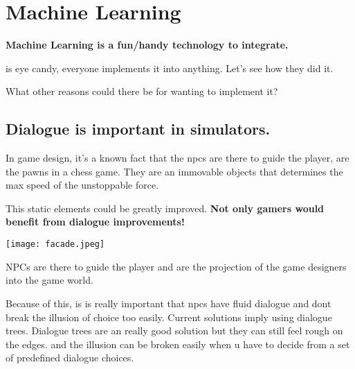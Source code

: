 



\chapter*{Machine Learning}
    \textbf{Machine Learning is a fun/handy technology to integrate.}

    is eye candy, everyone implements it into anything. Let's see how they did it.

    What other reasons could there be for wanting to implement it?

    \section*{Dialogue is important in simulators.}

      In game design, it's a known fact that the npcs are there to guide the player, are the pawns in a chess game. They are an immovable objects that determines the max speed of the unstoppable force.

      This static elements could be greatly improved. 
      \textbf{Not only gamers would benefit from dialogue improvements!}

        \texttt{[image: facade.jpeg]}

        NPCs are there to guide the player and are the projection of the game designers into the game world. 

        Because of this, is is really important that npcs have fluid dialogue and dont break the illusion of choice too easily.
        Current solutions imply using dialogue trees.
        Dialogue trees are an really good solution but they can still feel rough on the edges. and the illusion can be broken easily when u have to decide from a set of predefined dialogue choices.

